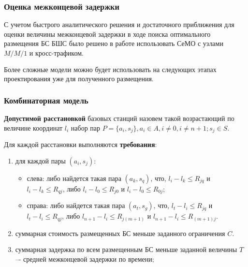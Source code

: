 \begin{frame}
    \justifying
    \frametitle{Оценка межконцевой задержки}

    С учетом быстрого аналитического решения и достаточного приближения для оценки величины межконцевой задержки в ходе поиска оптимального размещения БС БШС было решено в работе использовать СеМО с узлами $M/M/1$ и кросс-трафиком.

    \bigskip
    Более сложные модели можно будет использовать на следующих этапах проектирования уже для полученного размещения.

    
    \bigskip


\end{frame}

\begin{frame}
    \frametitle{Комбинаторная модель}
    \justifying
    \textbf{Допустимой расстановкой} базовых станций назовем такой возрастающий по величине координат $l_i$  набор пар $P = \{a_i, s_j\},a_i \in A,i \neq 0,i \neq n+1;s_j \in S$.

    \bigskip
    Для каждой расстановки выполняются \textbf{требования}:

    \begin{enumerate}
        \item  для каждой пары $(a_i,s_j)$:
            \begin{itemize}
                \item слева: либо найдется такая пара $(a_k,s_q)$, что, $l_i - l_k \leqslant R_{jq}$  и $l_i - l_k  \leqslant R_{qj}$, либо $l_i-l_0 \leqslant R_{j0}$ и $l_i - l_0 \leqslant R_{0j}$;
                \item справа: либо найдется такая пара $(a_t,s_g)$, что, $l_t-l_i \leqslant R_{jq}$ и $l_t - l_i \leqslant R_{qj}$, либо $l_{n+1}-l_i \leqslant R_{j(m+1)}$ и $l_{n+1}-l_i \leqslant R_{(m+1)j}$. 
            \end{itemize}
        \item суммарная стоимость размещенных БС меньше заданного ограничения  $C$.
        \item суммарная задержка по всем размещенным БС меньше заданной величины $T$ –- средней межконцевой задержки по времени;
    \end{enumerate}

\end{frame}

